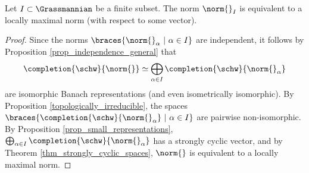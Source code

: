 \begin{cor}
Let $I\subset \Grassmannian$ be a finite subset.
The norm $\norm{}_I$ is equivalent to a locally maximal norm (with respect to some vector).
\end{cor} 
    \begin{proof}
    Since the norms $\braces{\norm{}_\alpha\ |\ \alpha\in I}$ are independent, it follows by Proposition \ref{prop_independence_general} that
    \[\completion{\schw}{\norm{}}\simeq \bigoplus_{\alpha\in I}\completion{\schw}{\norm{}_\alpha}\]
    are isomorphic Banach representations (and even isometrically isomorphic).
    By Proposition \ref{topologically_irreducible}, the spaces $\braces{\completion{\schw}{\norm{}_\alpha}\ |\ \alpha\in I}$ are pairwise non-isomorphic.
    By Proposition \ref{prop_small_representations}, $\bigoplus_{\alpha\in I}\completion{\schw}{\norm{}_\alpha}$ has a strongly cyclic vector, and by Theorem \ref{thm_strongly_cyclic_spaces}, $\norm{}$ is equivalent to a locally maximal norm.
    \end{proof} 

